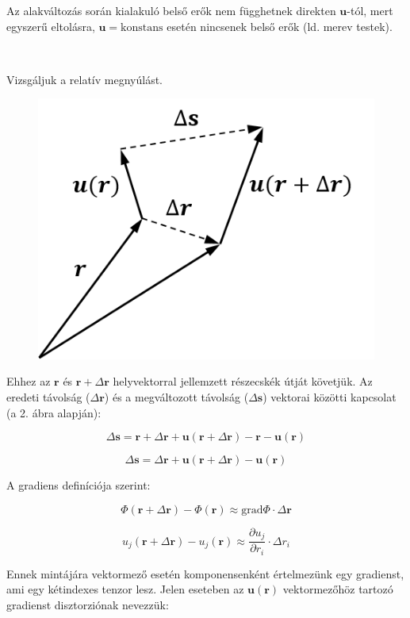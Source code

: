 \documentclass[a4paper, 12pt]{article}
\begin{document}
Az alakváltozás során kialakuló belső erők nem függhetnek direkten $\mathbf{u}$-tól, mert egyszerű eltolásra, $\mathbf{u}=\mathrm{konstans}$ esetén nincsenek belső erők (ld. merev testek).

~

Vizsgáljuk a relatív megnyúlást.

\begin{figure}[h]
\centering
\includegraphics[scale=0.4]{tetel2_2.png}
\caption{}
\end{figure}

Ehhez az $\mathbf{r}$ és $\mathbf{r}+\Delta\mathbf{r}$ helyvektorral jellemzett részecskék útját követjük. Az eredeti távolság ($\Delta\mathbf{r}$) és a megváltozott távolság ($\Delta\mathbf{s}$) vektorai közötti kapcsolat (a 2. ábra alapján):

$$\Delta\mathbf{s}=\mathbf{r}+\Delta\mathbf{r}+\mathbf{u}(\mathbf{r}+\Delta\mathbf{r})-\mathbf{r}-\mathbf{u}(\mathbf{r})$$

$$\Delta\mathbf{s}=\Delta\mathbf{r}+\mathbf{u}(\mathbf{r}+\Delta\mathbf{r})-\mathbf{u}(\mathbf{r})$$

A gradiens definíciója szerint:

$$\Phi(\mathbf{r}+\Delta\mathbf{r})-\Phi(\mathbf{r})\approx \mathrm{grad}\Phi\cdot\Delta\mathbf{r}$$

$$u_j(\mathbf{r}+\Delta\mathbf{r})-u_j(\mathbf{r})\approx \frac{\partial u_j}{\partial r_i}\cdot\Delta r_i$$

Ennek mintájára vektormező esetén komponensenként értelmezünk egy gradienst, ami egy kétindexes tenzor lesz. Jelen eseteben az $\mathbf{u}(\mathbf{r})$ vektormezőhöz tartozó gradienst disztorziónak nevezzük:
\end{document}
